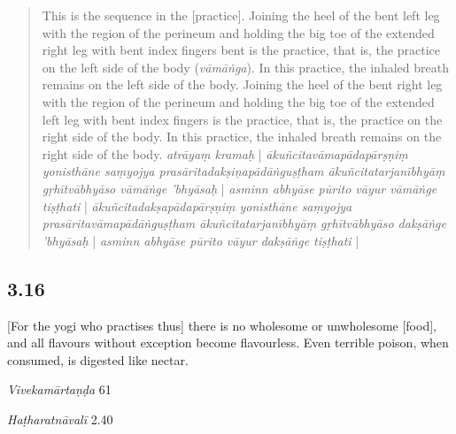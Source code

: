 \begin{ekdosis}
\begin{philcomm}[hp03_015]
\begin{quote}
This is the sequence in the [practice]. Joining the heel of the bent left leg with the region of the perineum and holding the big toe of the extended right leg with bent index fingers bent is the practice, that is, the practice on the left side of the body (\emph{vāmāṅga}). In this practice, the inhaled breath remains on the left side of the body. Joining the heel of the bent right leg with the region of the perineum and holding the big toe of the extended left leg with bent index fingers is the practice, that is, the practice on the right side of the body. In this practice, the inhaled breath remains on the right side of the body.
\emph{atrāyaṃ kramaḥ} | \emph{ākuñcitavāmapādapārṣṇiṃ yonisthāne saṃyojya prasāritadakṣiṇapādāṅguṣṭham ākuñcitatarjanībhyāṃ gṛhītvābhyāso vāmāṅge 'bhyāsaḥ} | \emph{asminn abhyāse pūrito vāyur vāmāṅge tiṣṭhati} | \emph{ākuñcita\-dakṣa\-pāda\-pārṣṇiṃ yonisthāne saṃyojya prasārita\-vāma\-pādā\-ṅguṣṭham ākuñcita\-tarjanībhyāṃ gṛhītvābhyāso dakṣāṅge 'bhyāsaḥ} | \emph{asminn abhyāse pūrito vāyur dakṣāṅge tiṣṭhati} |
\end{quote}

\end{philcomm}

\subsection*{3.16}
\begin{translation}[hp03_016]
{}[For the yogi who practises thus] there is no wholesome or unwholesome [food], and all flavours without exception become flavourless. Even terrible poison, when consumed, is digested like nectar.
\end{translation}

\begin{sources}[hp03_016]
\emph{Vivekamārtaṇḍa} 61
\begin{versinnote}
\tl{\var{jīryati] jīryate \vl, jāyate \vl}\\!}
\end{versinnote}
\end{sources}

\begin{testimonia}[hp03_016]
\emph{Haṭharatnāvalī} 2.40
\begin{versinnote}
\end{versinnote}
 

\end{testimonia}
\end{ekdosis}
